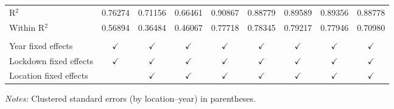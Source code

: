 \begin{tabular}{lcccccccc}
   R$^2$                        & 0.76274        & 0.71156        & 0.66461       & 0.90867        & 0.88779        & 0.89589        & 0.89356        & 0.88778\\
   Within R$^2$                 & 0.56894        & 0.36484        & 0.46067       & 0.77718        & 0.78345        & 0.79217        & 0.77946        & 0.70980\\
                                &                &                &               &                &                &                &                &  \\
   Year fixed effects           & $\checkmark$  & $\checkmark$  & $\checkmark$ & $\checkmark$  & $\checkmark$  & $\checkmark$  & $\checkmark$  & $\checkmark$\\
   Lockdown fixed effects       & $\checkmark$  & $\checkmark$  & $\checkmark$ & $\checkmark$  & $\checkmark$  & $\checkmark$  & $\checkmark$  & $\checkmark$\\
   Location fixed effects       &                & $\checkmark$  & $\checkmark$ & $\checkmark$  & $\checkmark$  & $\checkmark$  & $\checkmark$  & $\checkmark$\\
   \bottomrule
\end{tabular}
 
\medskip \emph{Notes:} Clustered standard errors (by location--year) in parentheses.


